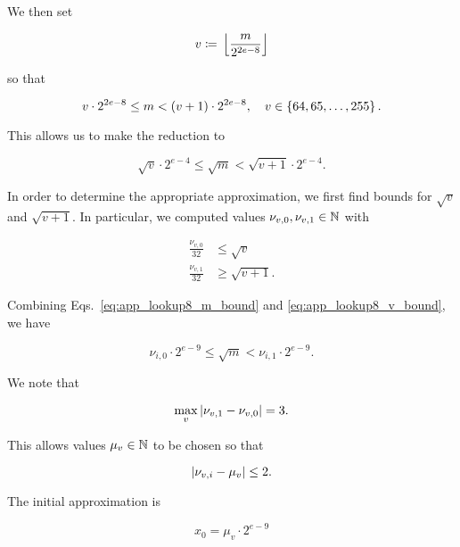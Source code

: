 \noindent
We then set

\begin{equation}
    v \coloneqq{} \left\lfloor \frac{m}{2^{2e-8}} \right\rfloor
\end{equation}

\noindent
so that

\begin{equation}
    v\cdot2^{2e-8} \le m < \left( v+1 \right)\cdot2^{2e-8},
    \quad v\in\left\{ 64, 65, \dots, 255 \right\}.
\end{equation}

\noindent
This allows us to make the reduction to

\begin{equation}
    \sqrt{v}\cdot2^{e-4} \le \sqrt{m} < \sqrt{v+1}\cdot2^{e-4}.
    \label{eq:app_lookup8_m_bound}
\end{equation}

In order to determine the appropriate approximation,
we first find bounds for $\sqrt{v}$ and $\sqrt{v+1}$.
In particular, we computed values $\nu_{v,0}, \nu_{v,1}\in\mathbb{N}$ with

\begin{align}
    \frac{\nu_{v,0}}{32} &\le \sqrt{v} \nonumber\\
    \frac{\nu_{v,1}}{32} &\ge \sqrt{v+1}.
    \label{eq:app_lookup8_v_bound}
\end{align}

\noindent
Combining Eqs.~\eqref{eq:app_lookup8_m_bound} and
\eqref{eq:app_lookup8_v_bound},
we have

\begin{equation}
    \nu_{i,0}\cdot2^{e-9} \le \sqrt{m} < \nu_{i,1}\cdot2^{e-9}.
\end{equation}

\noindent
We note that

\begin{equation}
    \max_{v} \left| \nu_{v,1} - \nu_{v,0} \right| = 3.
\end{equation}

\noindent
This allows values $\mu_{v}\in\mathbb{N}$ to be chosen so that

\begin{equation}
    \left| \nu_{v,i} - \mu_{v} \right| \le 2.
\end{equation}

The initial approximation is

\begin{equation}
    x_{0} = \mu_{v}\cdot2^{e-9}
\end{equation}

